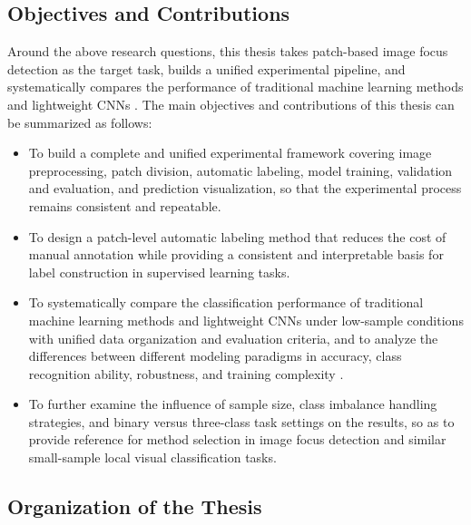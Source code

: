 \subsection{Objectives and Contributions}

\par Around the above research questions, this thesis takes patch-based image
focus detection as the target task, builds a unified experimental pipeline, and
systematically compares the performance of traditional machine learning methods
and lightweight CNNs \cite{Hou_2016_CVPR}. The main objectives and contributions
of this thesis can be summarized as follows:

\begin{itemize}
    \item To build a complete and unified experimental framework covering image
          preprocessing, patch division, automatic labeling, model training,
          validation and evaluation, and prediction visualization, so that the
          experimental process remains consistent and repeatable.

    \item To design a patch-level automatic labeling method that reduces the
          cost of manual annotation while providing a consistent and
          interpretable basis for label construction in supervised learning
          tasks.

    \item To systematically compare the classification performance of
          traditional machine learning methods and lightweight CNNs under
          low-sample conditions with unified data organization and evaluation
          criteria, and to analyze the differences between different modeling
          paradigms in accuracy, class recognition ability, robustness, and
          training complexity \cite[pp.~321--423,~465--500]{murphy2022pml}.

    \item To further examine the influence of sample size, class imbalance
          handling strategies, and binary versus three-class task settings on
          the results, so as to provide reference for method selection in image
          focus detection and similar small-sample local visual classification
          tasks.
\end{itemize}

\subsection{Organization of the Thesis}

